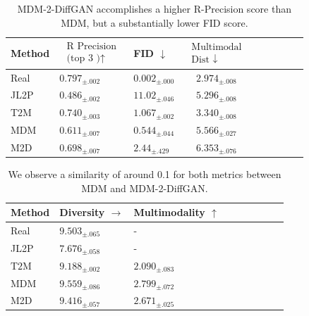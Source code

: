 \documentclass[10pt,twocolumn,letterpaper]{article}
\begin{document}
\begin{table}[h]
    \centering
    \begin{tabular}{|p{1.4cm}|p{1.8cm}|p{1.5cm}|c|c|c|c|c|c|}
    \hline Method & $\begin{array}{l}\text { R Precision } \\
    \text { (top } 3 \text { )↑ }\end{array}$ & FID $\downarrow$ & $\begin{array}{c}\text { Multimodal } \\
    \text { Dist } \downarrow\end{array}$ \\
    \hline Real & $0.797_{ \pm .002}$ & $0.002_{ \pm .000}$ & $2.974_{ \pm .008}$ \\
    \hline JL2P & $0.486_{ \pm .002}$ & $11.02_{ \pm .046}$ & $5.296_{ \pm .008}$ \\
    \hline $\mathrm{T} 2 \mathrm{M}$ & $0.740_{ \pm .003}$ & $1.067_{ \pm .002}$ & $3.340_{ \pm .008}$ \\
    \hline MDM & $0.611_{ \pm .007}$ & $0.544_{ \pm .044}$ & $5.566_{ \pm .027}$ \\
    \hline M2D & $0.698_{ \pm .007}$ & $2.44_{ \pm .429}$ & $6.353_{ \pm .076}$ \\
    \hline
    \end{tabular}
    \caption{MDM-2-DiffGAN accomplishes a higher R-Precision score than MDM, but a substantially lower FID score.}
    \label{tab:metrics}
\end{table}
\begin{table}[h]
    \begin{tabular}{|p{2cm}|p{2cm}|p{2cm}|c|c|c|c|c|c|}
        \hline Method & Diversity $\rightarrow$ & Multimodality $\uparrow$ \\
        \hline Real & $9.503_{ \pm .065}$ & - \\
        \hline JL2P & $7.676_{ \pm .058}$ & - \\
        \hline $\mathrm{T} 2 \mathrm{M}$ & $9.188_{ \pm .002}$ & $2.090_{ \pm .083}$ \\
        \hline MDM & $9.559_{ \pm .086}$ & $2.799_{ \pm .072}$ \\
        \hline M2D & $9.416_{ \pm .057}$ & $2.671_{ \pm .025}$ \\
        \hline
        \end{tabular}
    \caption{We observe a similarity of around 0.1 for both metrics between MDM and MDM-2-DiffGAN.}
    \label{tab:metrics2}
\end{table}
\end{document}
